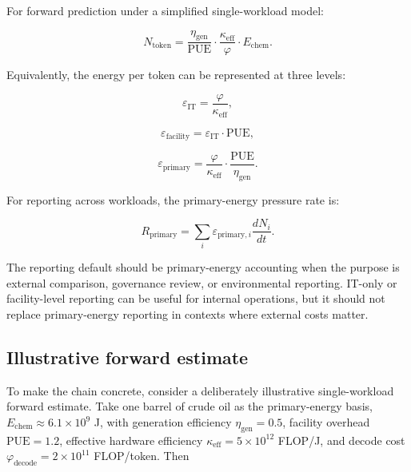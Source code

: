\documentclass[11pt]{article}
\begin{document}
For forward prediction under a simplified single-workload model:

\begin{equation}
N_{\mathrm{token}} =
\frac{\eta_{\mathrm{gen}}}{\mathrm{PUE}}
\cdot
\frac{\kappa_{\mathrm{eff}}}{\varphi}
\cdot
E_{\mathrm{chem}}.
\end{equation}

Equivalently, the energy per token can be represented at three levels:

\begin{equation}
\varepsilon_{\mathrm{IT}} =
\frac{\varphi}{\kappa_{\mathrm{eff}}},
\end{equation}

\begin{equation}
\varepsilon_{\mathrm{facility}} =
\varepsilon_{\mathrm{IT}} \cdot \mathrm{PUE},
\end{equation}

\begin{equation}
\varepsilon_{\mathrm{primary}} =
\frac{\varphi}{\kappa_{\mathrm{eff}}}
\cdot
\frac{\mathrm{PUE}}{\eta_{\mathrm{gen}}}.
\end{equation}

For reporting across workloads, the primary-energy pressure rate is:

\begin{equation}
R_{\mathrm{primary}} =
\sum_i
\varepsilon_{\mathrm{primary},i}
\frac{dN_i}{dt}.
\end{equation}

The reporting default should be primary-energy accounting when the purpose is external comparison, governance review, or environmental reporting. IT-only or facility-level reporting can be useful for internal operations, but it should not replace primary-energy reporting in contexts where external costs matter.

\subsection{Illustrative forward estimate}

To make the chain concrete, consider a deliberately illustrative single-workload forward estimate. Take one barrel of crude oil as the primary-energy basis, \(E_{\mathrm{chem}} \approx 6.1\times10^{9}\) J, with generation efficiency \(\eta_{\mathrm{gen}} = 0.5\), facility overhead \(\mathrm{PUE} = 1.2\), effective hardware efficiency \(\kappa_{\mathrm{eff}} = 5\times10^{12}\) FLOP/J, and decode cost \(\varphi_{\mathrm{decode}} = 2\times10^{11}\) FLOP/token. Then
\end{document}
